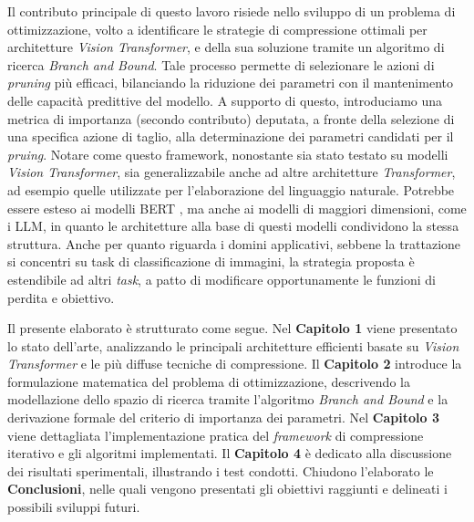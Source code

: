 Il contributo principale di questo lavoro risiede nello sviluppo di un problema di ottimizzazione, volto a identificare le strategie di compressione ottimali per architetture \textit{Vision Transformer}, e della sua soluzione tramite un algoritmo di ricerca \textit{Branch and Bound}. Tale processo permette di selezionare le azioni di \textit{pruning} più efficaci, bilanciando la riduzione dei parametri con il mantenimento delle capacità predittive del modello. A supporto di questo, introduciamo una metrica di importanza (secondo contributo) deputata, a fronte della selezione di una specifica azione di taglio, alla determinazione dei parametri candidati per il \textit{pruing}. Notare come questo framework, nonostante sia stato testato su modelli \textit{Vision Transformer}, sia generalizzabile anche ad altre architetture \textit{Transformer}, ad esempio quelle utilizzate per l'elaborazione del linguaggio naturale. Potrebbe essere esteso ai modelli BERT \cite{devlin2019bertpretrainingdeepbidirectional}, ma anche ai modelli di maggiori dimensioni, come i LLM, in quanto le architetture alla base di questi modelli condividono la stessa struttura. Anche per quanto riguarda i domini applicativi, sebbene la trattazione si concentri su task di classificazione di immagini, la strategia proposta è estendibile ad altri \textit{task}, a patto di modificare opportunamente le funzioni di perdita e obiettivo. \par
Il presente elaborato è strutturato come segue. Nel \textbf{Capitolo 1} viene presentato lo stato dell'arte, analizzando le principali architetture efficienti basate su \textit{Vision Transformer} e le più diffuse tecniche di compressione. Il \textbf{Capitolo 2} introduce la formulazione matematica del problema di ottimizzazione, descrivendo la modellazione dello spazio di ricerca tramite l'algoritmo \textit{Branch and Bound} e la derivazione formale del criterio di importanza dei parametri. Nel \textbf{Capitolo 3} viene dettagliata l'implementazione pratica del \textit{framework} di compressione iterativo e gli algoritmi implementati. Il \textbf{Capitolo 4} è dedicato alla discussione dei risultati sperimentali, illustrando i test condotti. Chiudono l'elaborato le \textbf{Conclusioni}, nelle quali vengono presentati gli obiettivi raggiunti e delineati i possibili sviluppi futuri.
